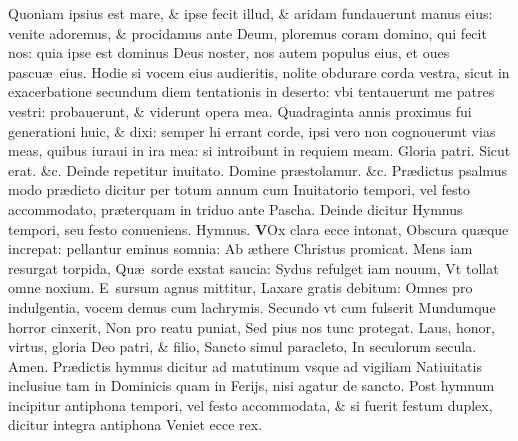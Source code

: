 \documentclass[a5paper,10pt]{book}
\def\ae{æ}
\begin{document}
\begin{multicols*}{2}
\newline \color{red} Q\color{black}uoniam ipsius est mare, \& ipse fecit illud, \& aridam fundauerunt manus eius: venite adoremus, \& procidamus ante Deum, ploremus coram domino, qui fecit nos: quia ipse est dominus Deus noster, nos autem populus eius, et oues pascu\ae \ eius.
\newline \color{red} H\color{black}odie si vocem eius audieritis, nolite obdurare corda vestra, sicut in exacerbatione secundum diem tentationis in deserto: vbi tentauerunt me patres vestri: probauerunt, \& viderunt opera mea.
\newline \color{red} Q\color{black}uadraginta annis proximus fui generationi huic, \& dixi: semper hi errant corde, ipsi vero non cognouerunt vias meas, quibus iuraui in ira mea: si introibunt in requiem meam.
\newline \color{red} G\color{black}loria patri. \color{red} S\color{black}icut erat. \&c.
\newline {} \color{red} Deinde repetitur inuitato. \color{black} Domine pr\ae stolamur. \color{red} \&c. \color{black}
\newline \color{red} Pr\ae dictus psalmus modo pr\ae dicto dicitur per totum annum cum Inuitatorio tempori, vel festo accommodato, pr\ae terquam in triduo ante Pascha. Deinde dicitur Hymnus tempori, seu festo conueniens. Hymnus. \color{black}
\vspace{-.25em}
\lettrine[lines=2]{\bfseries \color{red} V}{}Ox clara ecce intonat, Obscura qu\ae que increpat: pellantur eminus somnia: Ab \ae there Christus promicat.
\newline \color{red} M\color{black}ens iam resurgat torpida, Qu\ae \ sorde exstat saucia: Sydus refulget iam nouum, Vt tollat omne noxium.
\newline \color{red} E\color{black}\ sursum agnus mittitur, Laxare gratis debitum: Omnes pro indulgentia, vocem demus cum lachrymis.
\newline \color{red} S\color{black}ecundo vt cum fulserit Mundumque horror cinxerit, Non pro reatu puniat, Sed pius nos tunc protegat.
\newline \color{red} L\color{black}aus, honor, virtus, gloria Deo patri, \& filio, Sancto simul paracleto, In seculorum secula. Amen.
\newline {} \color{red} Pr\ae dictis hymnus dicitur ad matutinum vsque ad vigiliam Natiuitatis inclusiue tam in Dominicis quam in Ferijs, nisi agatur de sancto.
Post hymnum incipitur antiphona tempori, vel festo accommodata, \& si fuerit festum duplex, dicitur integra antiphona \color{black} Veniet ecce rex. \color{red}

\end{multicols*}
\end{document}
